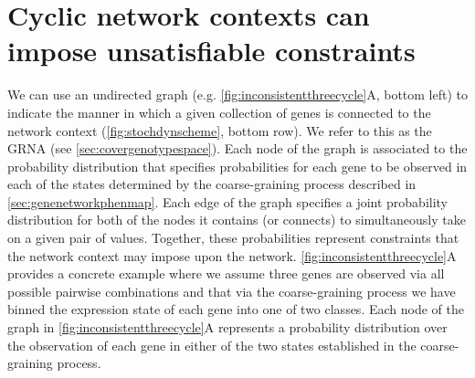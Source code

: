 \section{Cyclic network contexts can impose unsatisfiable constraints}\label{sec:cycliccontextunsatisfiableconstraints}

We can use an undirected graph (e.g. \ref{fig:inconsistentthreecycle}A, bottom left) to indicate the manner in which a given collection of genes is connected to the network context (\ref{fig:stochdynscheme}, bottom row). We refer to this as the GRNA (see \ref{sec:covergenotypespace}). Each node of the graph is associated to the probability distribution that specifies probabilities for each gene to be observed in each of the states determined by the coarse-graining process described in \ref{sec:genenetworkphenmap}. Each edge of the graph specifies a joint probability distribution for both of the nodes it contains (or connects) to simultaneously take on a given pair of values. Together, these probabilities represent constraints that the network context may impose upon the network.
\ref{fig:inconsistentthreecycle}A provides a concrete example where we assume three genes are observed via all possible pairwise combinations and that via the coarse-graining process we have binned the expression state of each gene into one of two classes.
Each node of the graph in \ref{fig:inconsistentthreecycle}A represents a probability distribution over the observation of each gene in either of the two states established in the coarse-graining process.
